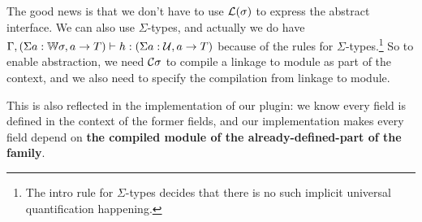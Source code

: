The good news is that we don't have to use ${\mathcal{L}}(\sigma)$ to
express the abstract interface. We can also use $\Sigma$-types, and actually
we do have ${ {\Gamma, (\Sigma a : {\mathbb{W}}\sigma, a \to T)
} \vdash {h} : {(\Sigma a : {\mathcal{U}}, a \to T)} }$ because of the rules for
$\Sigma$-types.\footnote{The intro rule for $\Sigma$-types decides that
there is no such implicit universal quantification happening.}
So to enable abstraction, we need ${\mathcal{C}}\sigma$ to compile a
linkage to module as part of the context, and we also need
 to specify the compilation from linkage to
module.


This is also reflected in the implementation of our plugin: we know
every field is defined in the context of the former fields, and our
implementation makes every field depend on \textbf{the
compiled module of the already-defined-part of the family}. 

